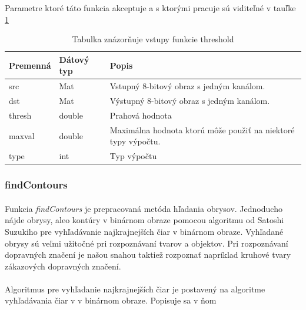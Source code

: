 \documentclass[12pt]{article}
\begin{document}
Parametre ktoré táto funkcia akceptuje a s ktorými pracuje sú viditeľné v tauľke \ref{thresholdPar}
\cite{OpenCVDoc}
\begin{table}
	\centering
    \begin{tabular}{ | l | l | p{5cm} |}
    \hline
    Premenná & Dátový typ & Popis \\ \hline
    src & Mat & Vstupný 8-bitový obraz s jedným kanálom. \\ \hline
    dst & Mat & Výstupný 8-bitový obraz s jedným kanálom. \\ \hline
    thresh & double & Prahová hodnota \\ \hline
    maxval & double & Maximálna hodnota ktorú môže použiť na niektoré typy výpočtu. \\ \hline
    type & int & Typ výpočtu \\
    \hline
    \end{tabular}
  	\caption{Tabulka znázorňuje vstupy funkcie threshold}
  	\label{thresholdPar}
\end{table}
\subsubsection{findContours}
\paragraph{}
Funkcia \emph{findContours} je prepracovaná metóda hľadania obrysov. Jednoducho nájde obrysy, aleo kontúry v binárnom obraze pomocou algoritmu od Satoshi Suzukiho pre vyhľadávanie najkrajnejších čiar v binárnom obraze.
Vyhľadané obrysy sú veľmi užitočné pri rozpoznávaní tvarov a objektov. Pri rozpoznávaní dopravných značení je našou snahou taktiež rozpoznať napríklad kruhové tvary zákazových dopravných značení.
\cite{OpenCVDoc}
\paragraph{}
Algoritmus pre vyhľadanie najkrajnejších čiar je postavený na algoritme vyhľadávania čiar v v binárnom obraze. Popisuje sa v ňom 
\cite{suzuky}
\end{document}
